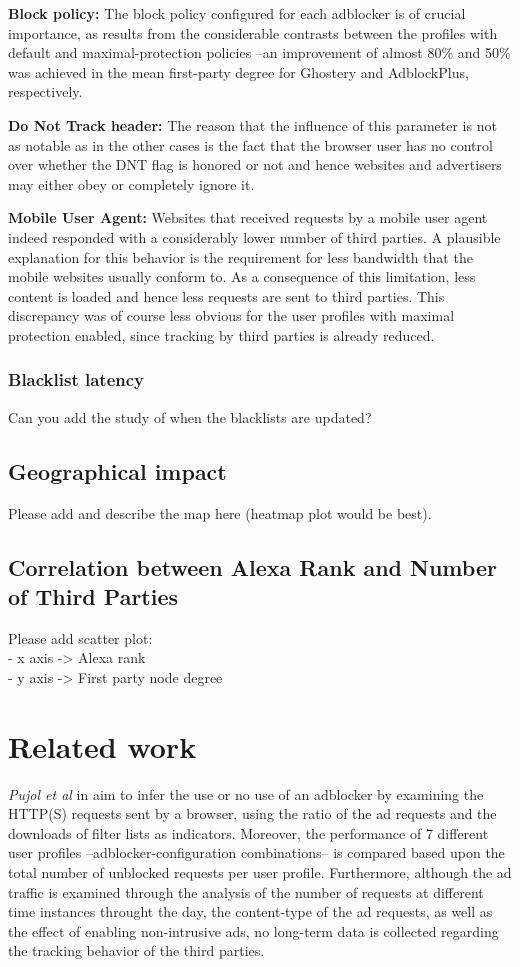 \documentclass{sig-alternate}
\begin{document}
\textbf{Block policy:} The block policy configured for each adblocker is of crucial importance, as results from the considerable contrasts between the profiles with default and maximal-protection policies --an improvement of almost 80\% and 50\% was achieved in the mean first-party degree for Ghostery and AdblockPlus, respectively.

\textbf{Do Not Track header:} The reason that the influence of this parameter is not as notable as in the other cases is the fact that the browser user has no control over whether the DNT flag is honored or not and hence websites and advertisers may either obey or completely ignore it.

\textbf{Mobile User Agent:} Websites that received requests by a mobile user agent indeed responded with a considerably lower number of third parties. A plausible explanation for this behavior is the requirement for less bandwidth that the mobile websites usually conform to. As a consequence of this limitation, less content is loaded and hence less requests are sent to third parties. This discrepancy was of course less obvious for the user profiles with maximal protection enabled, since tracking by third parties is already reduced.

\subsubsection{Blacklist latency}
{\color{red}Can you add the study of when the blacklists are updated?}

\subsection{Geographical impact}
{\color{red}Please add and describe the map here (heatmap plot would be best).}

\subsection{Correlation between Alexa Rank and Number of Third Parties}
{\color{red}Please add scatter plot:\\
- x axis -> Alexa rank\\
- y axis -> First party node degree
}

\section{Related work}

\textit{Pujol et al} in \cite{pujol} aim to infer the use or no use of an adblocker by examining the HTTP(S) requests sent by a browser, using the ratio of the ad requests and the downloads of filter lists as indicators. Moreover, the performance of 7 different user profiles --adblocker-configuration combinations-- is compared based upon the total number of unblocked requests per user profile. Furthermore, although the ad traffic is examined through the analysis of the number of requests at different time instances throught the day, the content-type of the ad requests, as well as the effect of enabling non-intrusive ads, no long-term data is collected regarding the tracking behavior of the third parties.
\end{document}
